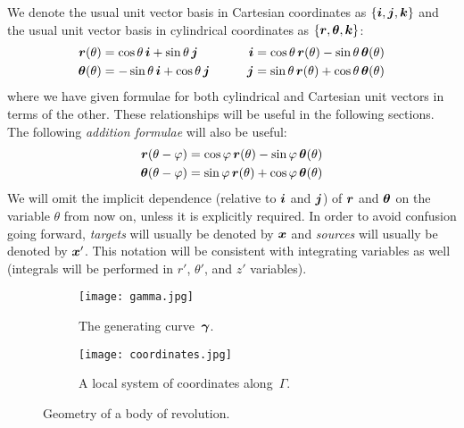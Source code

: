 \documentclass[11pt]{article}
\renewcommand{\phi}{\varphi}
\newcommand{\vct}{\vectorsym}
\newcommand{\bx}{\vct{ x}}
\newcommand\ihat{\vct{{i}}}
\newcommand\jhat{\vct{{j}}}
\newcommand\khat{\vct{{k}}}
\newcommand\rhat{\vct{{r}}}
\newcommand\thetahat{{\vct{{\theta}}}}
\numberwithin{equation}{section}
\begin{document}
We denote the usual unit vector basis in Cartesian coordinates as
$\{ \ihat, \jhat, \khat \}$ and the usual unit vector basis in
cylindrical coordinates as $\{\rhat, \thetahat, \khat \}$:
\begin{equation}
  \begin{aligned}
    \rhat(\theta) &= \cos\theta \, \ihat + \sin\theta \, \jhat
    &\qquad \ihat &= \cos\theta \, \rhat(\theta) - \sin\theta \,
    \thetahat(\theta) \\
    \thetahat(\theta) &= -\sin\theta \, \ihat + \cos\theta \, \jhat
    &\qquad \jhat &= \sin\theta \, \rhat(\theta) + \cos\theta \,
    \thetahat(\theta)
    \end{aligned}
\end{equation}
where we have given formulae for both cylindrical and Cartesian unit
vectors in terms of the other. These relationships will be useful in
the following sections. The following \emph{addition formulae} will also be
useful:
\begin{equation}\label{eq_vecaddition}
  \begin{aligned}
    \rhat(\theta-\phi) &= \cos\phi \, \rhat(\theta) -
    \sin\phi \, \thetahat(\theta) \\
    \thetahat(\theta-\phi) &= \sin\phi \, \rhat(\theta) +
    \cos\phi \, \thetahat(\theta) \\
  \end{aligned}
\end{equation}
We will omit the implicit dependence (relative to $\ihat$ and $\jhat$)
of $\rhat$ and $\thetahat$ on the variable $\theta$ from now on,
unless it is explicitly required. In order to avoid confusion going
forward, {\em targets} will usually be denoted by $\bx$ and {\em
  sources} will usually be denoted by $\bx'$. This notation will be
consistent with integrating variables as well (integrals will be
performed in $r'$, $\theta'$, and $z'$ variables).

\begin{figure}[t]
  \centering
  \begin{subfigure}[b]{.35\linewidth}
    \centering
    \texttt{[image: gamma.jpg]}
    \caption{The generating curve~$\vct{\gamma}$.}
  \end{subfigure}
  \hfill
  \begin{subfigure}[b]{.6\linewidth}
    \centering
    \texttt{[image: coordinates.jpg]}
    \caption{A local system of coordinates along~$\Gamma$.}
  \end{subfigure}
  \caption{Geometry of a body of revolution.}
  \label{fig_geo}
\end{figure}
\end{document}
